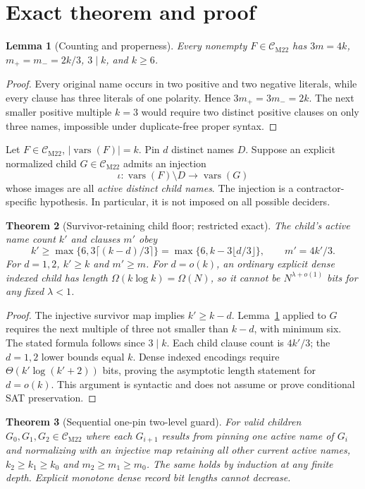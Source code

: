 \documentclass[11pt]{article}
\newtheorem{theorem}{Theorem}
\newtheorem{lemma}[theorem]{Lemma}
\newcommand{\CM}{\mathcal C_{\mathrm{M22}}}
\begin{document}
\section{Exact theorem and proof}
\begin{lemma}[Counting and properness]\label{count}
Every nonempty \(F\in\CM\) has \(3m=4k\), \(m_+=m_-=2k/3\), \(3\mid k\), and \(k\ge6\).
\end{lemma}
\begin{proof}
Every original name occurs in two positive and two negative literals, while every clause has three literals of one polarity. Hence \(3m_+=3m_-=2k\). The next smaller positive multiple \(k=3\) would require two distinct positive clauses on only three names, impossible under duplicate-free proper syntax.
\end{proof}
Let \(F\in\CM\), \(|\operatorname{vars}(F)|=k\). Pin \(d\) distinct names \(D\). Suppose an explicit normalized child \(G\in\CM\) admits an injection
\[
\iota:\operatorname{vars}(F)\setminus D\longrightarrow
\operatorname{vars}(G)
\]
whose images are all \emph{active distinct child names}. The injection is a contractor-specific hypothesis. In particular, it is not imposed on all possible deciders.
\begin{theorem}[Survivor-retaining child floor; restricted exact]\label{floor}
The child's active name count \(k'\) and clauses \(m'\) obey
\[
\boxed{k'\ge\max\{6,3\lceil(k-d)/3\rceil\}
=\max\{6,k-3\lfloor d/3\rfloor\}},\qquad
m'=4k'/3.
\]
For \(d=1,2\), \(k'\ge k\) and \(m'\ge m\). For \(d=o(k)\), an ordinary explicit dense indexed child has length \(\Omega(k\log k)=\Omega(N)\), so it cannot be \(N^{\lambda+o(1)}\) bits for any fixed \(\lambda<1\).
\end{theorem}
\begin{proof}
The injective survivor map implies \(k'\ge k-d\). Lemma~\ref{count} applied to \(G\) requires the next multiple of three not smaller than \(k-d\), with minimum six. The stated formula follows since \(3\mid k\). Each child clause count is \(4k'/3\); the \(d=1,2\) lower bounds equal \(k\). Dense indexed encodings require \(\Theta(k'\log(k'+2))\) bits, proving the asymptotic length statement for \(d=o(k)\). This argument is syntactic and does not assume or prove conditional SAT preservation.
\end{proof}
\begin{theorem}[Sequential one-pin two-level guard]\label{two}
For valid children \(G_0,G_1,G_2\in\CM\) where each \(G_{i+1}\) results from pinning one active name of \(G_i\) and normalizing with an injective map retaining all other current active names, \(k_2\ge k_1\ge k_0\) and \(m_2\ge m_1\ge m_0\). The same holds by induction at any finite depth. Explicit monotone dense record bit lengths cannot decrease.
\end{theorem}
\end{document}
